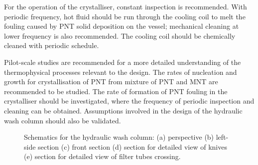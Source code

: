 For the operation of the crystalliser, constant inspection is recommended. With periodic frequency, hot fluid should be run through the cooling coil to melt the fouling caused by PNT solid deposition on the vessel; mechanical cleaning at lower frequency is also recommended. The cooling coil should be chemically cleaned with periodic schedule. 


Pilot-scale studies are recommended for a more detailed understanding of the thermophysical processes relevant to the design. The rates of nucleation and growth for crystallisation of PNT from mixture of PNT and MNT are recommended to be studied. The rate of formation of PNT fouling in the crystalliser should be investigated, where the frequency of periodic inspection and cleaning can be obtained. Assumptions involved in the design of the hydraulic wash column should also be validated. 

\begin{figure}[h!]
    \centering
    
    \caption{Schematics for the hydraulic wash column: (a) perspective (b) left-side section (c) front section (d) section for detailed view of knives (e) section for detailed view of filter tubes crossing.}
    \label{fig:wash column schematic}
\end{figure}





